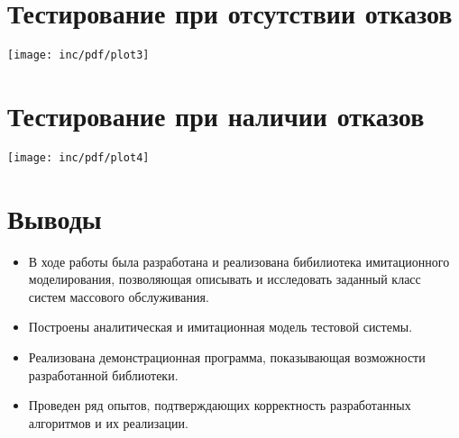 \documentclass[12pt]{article}
\begin{document}





\normalsize
\section{Тестирование при отсутствии отказов}
\centering
\texttt{[image: inc/pdf/plot3]}

\section{Тестирование при наличии отказов}
\texttt{[image: inc/pdf/plot4]}



\section{Выводы}

\small

\begin{itemize}

\item В ходе работы была разработана и реализована бибилиотека имитационного моделирования, позволяющая описывать и исследовать заданный класс систем массового обслуживания.

\item Построены аналитическая и имитационная модель тестовой системы.

\item Реализована демонстрационная программа, показывающая возможности разработанной библиотеки.

\item Проведен ряд опытов, подтверждающих корректность разработанных алгоритмов и их реализации.

\end{itemize}
\normalsize
\end{document}

